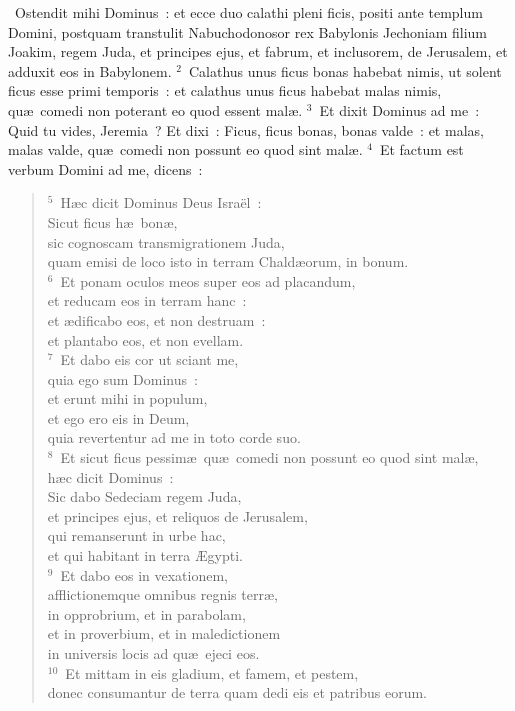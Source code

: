 ~\lettrine[lines=10,image=true,loversize=0.05,lraise=-0.03]{O}{}stendit mihi Dominus~: et ecce duo calathi pleni ficis, positi ante templum Domini, postquam transtulit Nabuchodonosor rex Babylonis Jechoniam filium Joakim, regem Juda, et principes ejus, et fabrum, et inclusorem, de Jerusalem, et adduxit eos in Babylonem.
${}^{2}$~Calathus unus ficus bonas habebat nimis, ut solent ficus esse primi temporis~: et calathus unus ficus habebat malas nimis, qu\ae\ comedi non poterant eo quod essent mal\ae .
${}^{3}$~Et dixit Dominus ad me~: Quid tu vides, Jeremia~? Et dixi~: Ficus, ficus bonas, bonas valde~: et malas, malas valde, qu\ae\ comedi non possunt eo quod sint mal\ae .
${}^{4}$~Et factum est verbum Domini ad me, dicens~:
\begin{flushleft}\begin{verse}${}^{5}$~H\ae c dicit Dominus Deus Isra\"el~:\\ Sicut ficus h\ae\ bon\ae ,\\ sic cognoscam transmigrationem Juda,\\ quam emisi de loco isto in terram Chald\ae orum, in bonum.\\
${}^{6}$~Et ponam oculos meos super eos ad placandum,\\ et reducam eos in terram hanc~:\\ et \ae dificabo eos, et non destruam~:\\ et plantabo eos, et non evellam.\\
${}^{7}$~Et dabo eis cor ut sciant me,\\ quia ego sum Dominus~:\\ et erunt mihi in populum,\\ et ego ero eis in Deum,\\ quia revertentur ad me in toto corde suo.\\
${}^{8}$~Et sicut ficus pessim\ae\ qu\ae\ comedi non possunt eo quod sint mal\ae ,\\ h\ae c dicit Dominus~:\\ Sic dabo Sedeciam regem Juda,\\ et principes ejus, et reliquos de Jerusalem,\\ qui remanserunt in urbe hac,\\ et qui habitant in terra \AE gypti.\\
${}^{9}$~Et dabo eos in vexationem,\\ afflictionemque omnibus regnis terr\ae ,\\ in opprobrium, et in parabolam,\\ et in proverbium, et in maledictionem\\ in universis locis ad qu\ae\ ejeci eos.\\
${}^{10}$~Et mittam in eis gladium, et famem, et pestem,\\ donec consumantur de terra quam dedi eis et patribus eorum.\end{verse}\end{flushleft}


